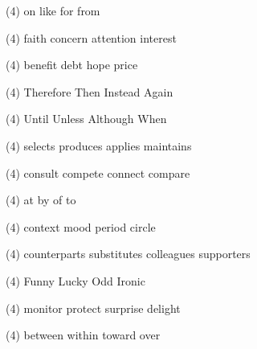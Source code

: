 \item
\begin{tasks}(4)
	\task on
	\task like
	\task for
	\task from
\end{tasks}
\item
\begin{tasks}(4)
	\task faith
	\task concern
	\task attention
	\task interest
\end{tasks}
\item
\begin{tasks}(4)
	\task benefit
	\task debt
	\task hope
	\task price
\end{tasks}
\item
\begin{tasks}(4)
	\task Therefore
	\task Then
	\task Instead
	\task Again
\end{tasks}
\item
\begin{tasks}(4)
	\task Until
	\task Unless
	\task Although
	\task When
\end{tasks}
\item
\begin{tasks}(4)
	\task selects
	\task produces
	\task applies
	\task maintains
\end{tasks}
\item
\begin{tasks}(4)
	\task consult
	\task compete
	\task connect
	\task compare
\end{tasks}
\item
\begin{tasks}(4)
	\task at
	\task by
	\task of
	\task to
\end{tasks}
\item
\begin{tasks}(4)
	\task context
	\task mood
	\task period
	\task circle
\end{tasks}
\item
\begin{tasks}(4)
	\task counterparts
	\task substitutes
	\task colleagues
	\task supporters
\end{tasks}
\item
\begin{tasks}(4)
	\task Funny
	\task Lucky
	\task Odd
	\task Ironic
\end{tasks}
\item
\begin{tasks}(4)
	\task monitor
	\task protect
	\task surprise
	\task delight
\end{tasks}
\item
\begin{tasks}(4)
	\task between
	\task within
	\task toward
	\task over
\end{tasks}
